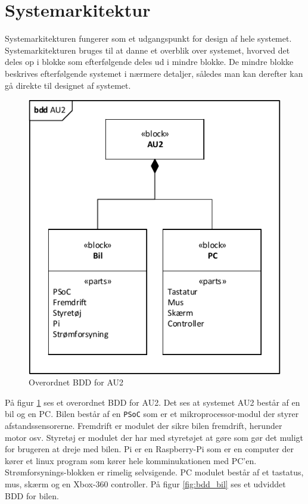 \section{Systemarkitektur}
\label{ch:Systemarkitektur}
Systemarkitekturen fungerer som et udgangspunkt for design af hele systemet.
Systemarkitekturen bruges til at danne et overblik over systemet, hvorved det deles op i blokke som efterfølgende deles ud i mindre blokke. De mindre blokke beskrives efterfølgende systemet i nærmere detaljer, således man kan derefter kan gå direkte til designet af systemet. 

\begin{figure}[h]
\centering
\includegraphics[scale=1]{../fig/diagrammer/bdd_au2.pdf}
\caption{Overordnet BDD for AU2}
\label{fig:bdd_au2}
\end{figure}
På figur \ref{fig:bdd_au2} ses et overordnet BDD for AU2. Det ses at systemet AU2 består af en bil og en PC. Bilen består af en \texttt{PSoC} som er et mikroprocessor-modul der styrer afstandssensorerne. Fremdrift er modulet der sikre bilen fremdrift, herunder motor osv. Styretøj er modulet der har med styretøjet at gøre som gør det muligt for brugeren at dreje med bilen. Pi er en Raspberry-Pi som er en computer der kører et linux program som kører hele komminukationen med PC'en. Strømforsynings-blokken er rimelig selvsigende. PC modulet består af et tastatus, mus, skærm og en Xbox-360 controller. På figur \ref{fig:bdd_bil} ses et udviddet BDD for bilen.  

